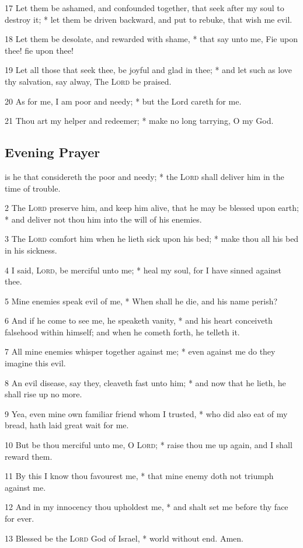 17 Let them be ashamed, and confounded together, that seek after my soul to destroy it; * let them be driven backward, and put to rebuke, that wish me evil.\par
18 Let them be desolate, and rewarded with shame, * that say unto me, Fie upon thee! fie upon thee!\par
19 Let all those that seek thee, be joyful and glad in thee; * and let such as love thy salvation, say alway, The {\textsc{Lord}} be praised.\par
20 As for me, I am poor and needy; * but the Lord careth for me.\par
21 Thou art my helper and redeemer; * make no long tarrying, O my God.
\subsection{Evening Prayer}
 is he that considereth the poor and needy; * the {\textsc{Lord}} shall deliver him in the time of trouble.\par
2 The {\textsc{Lord}} preserve him, and keep him alive, that he may be blessed upon earth; * and deliver not thou him into the will of his enemies.\par
3 The {\textsc{Lord}} comfort him when he lieth sick upon his bed; * make thou all his bed in his sickness.\par
4 I said, {\textsc{Lord}}, be merciful unto me; * heal my soul, for I have sinned against thee.\par
5 Mine enemies speak evil of me, * When shall he die, and his name perish?\par
6 And if he come to see me, he speaketh vanity, * and his heart conceiveth falsehood within himself; and when he cometh forth, he telleth it.\par
7 All mine enemies whisper together against me; * even against me do they imagine this evil.\par
8 An evil disease, say they, cleaveth fast unto him; * and now that he lieth, he shall rise up no more.\par
9 Yea, even mine own familiar friend whom I trusted, * who did also eat of my bread, hath laid great wait for me.\par
10 But be thou merciful unto me, O {\textsc{Lord}}; * raise thou me up again, and I shall reward them.\par
11 By this I know thou favourest me, * that mine enemy doth not triumph against me.\par
12 And in my innocency thou upholdest me, * and shalt set me before thy face for ever.\par
13 Blessed be the {\textsc{Lord}} God of Israel, * world without end. Amen.

